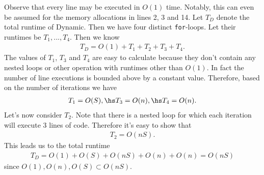 \documentclass{article}
\begin{document}
Observe that every line may be executed in $O(1)$ time. Notably, this
can even be assumed for the memory allocations in lines 2, 3 and 14.
Let $T_D$ denote the total runtime of Dynamic.
Then we have four distinct \texttt{for}-loops. Let their runtimes be
$T_1, ..., T_4$. Then we know
\begin{align*}
	T_D = O(1) + T_1 + T_2 + T_3 + T_4.
\end{align*}
The values of $T_1$, $T_3$ and $T_4$ are easy to calculate because
they don't contain any nested loops or other operation with runtimes
other than $O(1)$. In fact the number of line executions is bounded
above by a constant value. Therefore, based on the number of
iterations we have
\begin{align*}
	T_1 = O(S),\hs T_3 = O(n),\hs T_4 = O(n).
\end{align*}
Let's now consider $T_2$. Note that there is a nested loop for which
each iteration will execute 3 lines of code. Therefore it's easy to show that
\begin{align*}
	T_2 = O(nS).
\end{align*}
This leads us to the total runtime
\begin{align*}
	T_D = O(1) + O(S) + O(nS) + O(n) + O(n) = O(nS)
\end{align*}
since $O(1),O(n),O(S)\subset O(nS)$.
\end{document}
